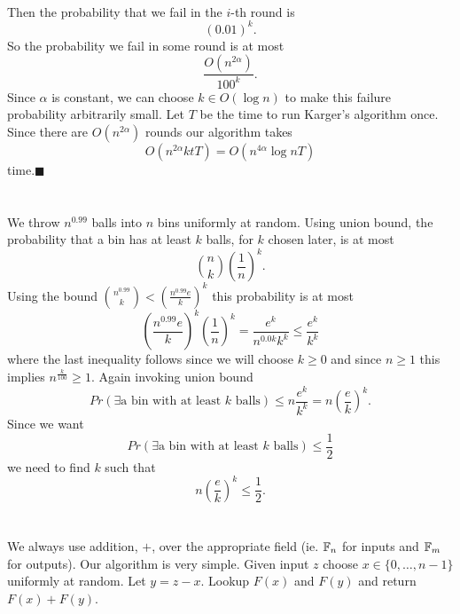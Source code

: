 \documentclass[letterpaper,12pt,oneside,onecolumn]{article}
\begin{document}
\paragraph{}
Then the probability that we fail in the $i$-th round is
$$(0.01)^k.$$
So the probability we fail in some round is at most
$$\frac{O(n^{2\alpha})}{100^k}.$$
Since $\alpha$ is constant, we can choose $k \in O(\log n)$ to make this failure probability arbitrarily small. Let $T$ be the time to run Karger's algorithm once.  Since there are $O(n^{2\alpha})$ rounds our algorithm takes
$$O(n^{2\alpha}ktT) = O(n^{4\alpha}\log n T)$$
time.$ \blacksquare$

\newpage
\section{}
\paragraph{}
We throw $n^{0.99}$ balls into $n$ bins uniformly at random. Using union bound, the probability that a bin has at least $k$ balls, for $k$ chosen later, is at most 
$${n \choose k}(\frac{1}{n})^k.$$
Using the bound ${n^{0.99}\choose k} <(\frac{n^{0.99}e}{k})^k$ this probability is at most
$$(\frac{n^{0.99}e}{k})^k(\frac{1}{n})^k= \frac{e^k}{n^{0.0k}k^k}\leq \frac{e^k}{k^k}$$
where the last inequality follows since we will choose $k \geq 0$ and since $n\geq 1$ this implies $n^\frac{k}{100} \geq 1$.
Again invoking union bound
$$Pr(\exists\text{a bin with at least $k$ balls}) \leq n\frac{e^k}{k^k} = n(\frac{e}{k})^k.$$ 
Since we want
$$Pr(\exists\text{a bin with at least $k$ balls}) \leq \frac{1}{2}$$
we need to find $k$ such that
$$n(\frac{e}{k})^k \leq \frac{1}{2}.$$

\newpage
\section{}
\paragraph{}
We always use addition, $+$, over the appropriate field (ie. $\mathbb{F}_n$ for inputs and $\mathbb{F}_m$ for outputs). Our algorithm is very simple. Given input $z$ choose $x \in \{0,\dots, n-1\}$ uniformly at random. Let $y = z-x$. Lookup $F(x)$ and $F(y)$ and return $F(x) + F(y)$.
\end{document}
